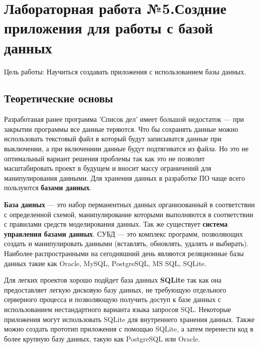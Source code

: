 \documentclass[a4paper]{article}
\begin{document}
\newpage
\section{Лабораторная работа №5.\newline Создние приложения для работы с базой данных}

Цель работы: Научиться создавать приложения с использованием базы данных.

\subsection{Теоретические основы}

Разработаная ранее программа 'Список дел' имеет большой недостаток --- при закрытии программы все данные теряются. Что бы сохранять данные можно использовать текстовый файл в который будут записыватся данные при выключении, а при включениии данные будут подтягиватся из файла. Но это не оптимальный вариант решения проблемы так как это не позволит масштабировать проект в будущем и вносит массу ограничений для манипулирования данными. Для хранения данных в разработке ПО чаще всего пользуются \textbf{базами данных}.

\textbf{База данных} --- это набор перманентных данных организованный в соответствии с определенной схемой, манипулирование которыми выполняются в соответствии с правилами средств моделирования данных. Так же существует \textbf{система управления базами данных}. СУБД --- это комплекс программ, позволяющих создать и манипулировать данными (вставлять, обновлять, удалять и выбирать). Наиболее распространными на сегодняшний день являются реляционные базы данных такие как Oracle, MySQL, PostgreSQL, MS SQL, SQLite.

Для легких проектов хорошо подйдет база данных \textbf{SQLite} так как она предоставляет легкую дисковую базу данных, не требующую отдельного серверного процесса и позволяющую получить доступ к базе данных с использованием нестандартного варианта языка запросов SQL. Некоторые приложения могут использовать SQLite для внутреннего хранения данных. Также можно создать прототип приложения с помощью SQLite, а затем перенести код в более крупную базу данных, такую как PostgreSQL или Oracle.
\end{document}
